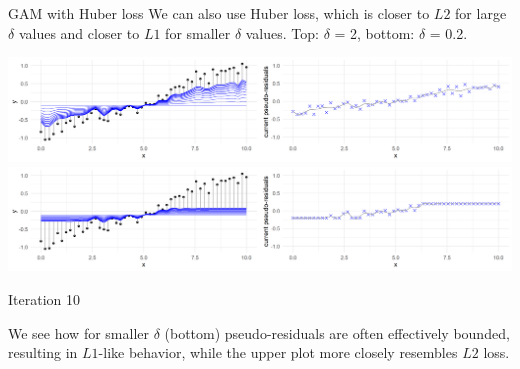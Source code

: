 \begin{frame}{GAM with Huber loss}
We can also use Huber loss, which is closer to $L2$ for large $\delta$ values 
and closer to $L1$ for 
smaller $\delta$ values. Top: $\delta$ = 2, bottom: $\delta$ = 0.2.

\vfill

\includegraphics[width=\textwidth]{figure/illustration_gaussian_huber_2_10.png}
\includegraphics[width=\textwidth]{figure/illustration_gaussian_huber_02_10.png}

\vfill

Iteration 10

\vfill

\footnotesize
We see how for smaller $\delta$ (bottom) pseudo-residuals are often effectively
bounded, resulting in $L1$-like behavior, while the upper plot more closely 
resembles $L2$ loss.

\end{frame}


